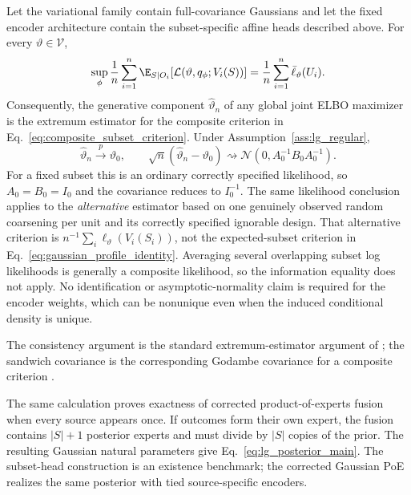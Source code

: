 \begin{theorem}
\label{thm:lg_profile_mle}
Let the variational family contain full-covariance Gaussians and let the
fixed encoder architecture contain the subset-specific affine heads described
above.  For every $\vartheta\in\mathcal V$,
\begin{equation}
 \sup_\phi\frac1n\sum_{i=1}^n
 \E_{S\mid O_i}[\mathcal L(\vartheta,q_\phi;V_i(S))]
 =\frac1n\sum_{i=1}^n\bar\ell_\vartheta(U_i).
 \label{eq:gaussian_profile_identity}
\end{equation}
Consequently, the generative component $\widehat\vartheta_n$ of any global
joint ELBO maximizer is the extremum estimator for the composite criterion in
Eq.~\eqref{eq:composite_subset_criterion}.  Under
Assumption~\ref{ass:lg_regular},
\[
 \widehat\vartheta_n\xrightarrow{p}\vartheta_0,
 \qquad
 \sqrt n(\widehat\vartheta_n-\vartheta_0)
 \rightsquigarrow\mathcal N(0,A_0^{-1}B_0A_0^{-1}).
\]
For a fixed subset this is an ordinary correctly specified likelihood, so
$A_0=B_0=I_0$ and the covariance reduces to $I_0^{-1}$.  The same likelihood
conclusion applies to the \emph{alternative} estimator based on one genuinely
observed random coarsening per unit and its correctly specified ignorable
design.  That alternative criterion is
$n^{-1}\sum_i\ell_\vartheta(V_i(S_i))$, not the expected-subset criterion in
Eq.~\eqref{eq:gaussian_profile_identity}.  Averaging several overlapping
subset log likelihoods is generally a composite likelihood, so the
information equality does not apply.
No identification or asymptotic-normality claim is required for the encoder
weights, which can be nonunique even when the induced conditional density is
unique.
\end{theorem}

The consistency argument is the standard extremum-estimator argument of
\citet{NeweyMcFadden1994}; the sandwich covariance is the corresponding
Godambe covariance for a composite criterion
\citep{VarinReidFirth2011}.

The same calculation proves exactness of corrected product-of-experts fusion
when every source appears once.  If outcomes form their own expert, the
fusion contains $|S|+1$ posterior experts and must divide by $|S|$ copies of
the prior.  The resulting Gaussian natural parameters give
Eq.~\eqref{eq:lg_posterior_main}.  The subset-head construction is an
existence benchmark; the corrected Gaussian PoE realizes the same posterior
with tied source-specific encoders.

